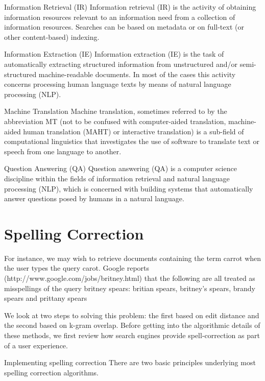 Information Retrieval (IR)
Information retrieval (IR) is the activity of obtaining information resources relevant to an information need from a collection of information resources. Searches can be based on metadata or on full-text (or other content-based) indexing.

Information Extraction (IE)
Information extraction (IE) is the task of automatically extracting structured information from unstructured and/or semi-structured machine-readable documents. In most of the cases this activity concerns processing human language texts by means of natural language processing (NLP).

Machine Translation
Machine translation, sometimes referred to by the abbreviation MT (not to be confused with computer-aided translation, machine-aided human translation (MAHT) or interactive translation) is a sub-field of computational linguistics that investigates the use of software to translate text or speech from one language to another.

Question Answering (QA)
Question answering (QA) is a computer science discipline within the fields of information retrieval and natural language processing (NLP), which is concerned with building systems that automatically answer questions posed by humans in a natural language.

\section{Spelling Correction}

For instance, we may wish to retrieve documents containing the term carrot when the user types the query carot. Google reports (http://www.google.com/jobs/britney.html) that the following are all treated as misspellings of the query britney spears: britian spears, britney’s spears, brandy spears and prittany spears

We look at two steps to solving this problem: the first based on edit distance and the second based on k-gram overlap. Before getting into the algorithmic details of these methods, we first review how search engines provide spell-correction as part of a user experience.

Implementing spelling correction
There are two basic principles underlying most spelling correction algorithms.

